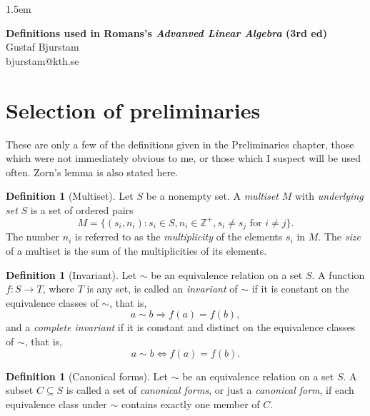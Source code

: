 \documentclass[12pt]{article}
\theoremstyle{definition}
\newtheorem{definition}[theorem]{Definition}
\newcommand{\Z}{\mathbb{Z}}     %
\begin{document}
\baselineskip 1.5em

\begin{center}
\textbf{\large Definitions used in Romans's \textit{Advanved Linear Algebra} (3rd ed)} \\
Gustaf Bjurstam\\
bjurstam@kth.se\\
\end{center}
\setcounter{section}{-1}
\section{Selection of preliminaries}
These are only a few of the definitions given in the Preliminaries chapter, those which were not immediately obvious to me, or those which I suspect will be used often. Zorn's lemma is also stated here.
\begin{definition}[Multiset]
    Let $S$ be a nonempty set. A \textit{multiset} $M$ with \textit{underlying set} $S$ is a set of ordered pairs
    \begin{equation*}
        M=\{(s_i,n_i) : s_i\in S, n_i\in \Z^+, s_i\neq s_j \text{ for } i\neq j\}.
    \end{equation*}
    The number $n_i$ is referred to as the \textit{multiplicity} of the elements $s_i$ in $M$. The \textit{size} of a multiset is the sum of the multiplicities of its elements.
\end{definition}
\begin{definition}[Invariant]
    Let $\sim$ be an equivalence relation on a set $S$. A function $f:S\to T$, where $T$ is any set, is called an \textit{invariant} of $\sim$ if it is constant on the equivalence classes of $\sim$, that is, 
    \begin{equation*}
        a\sim b\Longrightarrow f(a)=f(b),
    \end{equation*}
    and a \textit{complete invariant} if it is constant and distinct on the equivalence classes of $\sim$, that is,
    \begin{equation*}
        a\sim b\Longleftrightarrow f(a)=f(b).
    \end{equation*}
\end{definition}
\begin{definition}[Canonical forms]
    Let $\sim$ be an equivalence relation on a set $S$. A subset $C\subseteq S$ is called a set of \textit{canonical forms}, or just a \textit{canonical form}, if  each equivalence class under $\sim$ contains exactly one member of $C$.
\end{definition}
\end{document}
